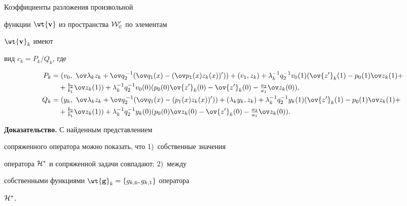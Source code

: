 \begin{thm} 


Коэффициенты разложения произвольной  


функции $\wt{\bold v}$ из пространства $\cal W^0_2$ по элементам 


$\wt{\bold v}_k$ имеют 


вид $c_k=P_k/Q_k$, где  


\begin{align*} 


P_k&=(v_0,\ \ov\lambda_k z_k+\ov q_2^{\,-1}(\ov q_1(x)- 


(\ov p_1(x)z_k(x))'))+


(v_1,z_k)+\lambda^{-1}_k q^{-1}_2 v_0(1)(\ov{z'}_k(1)- 


p_0(1)\ov z_k(1)+ \\ 


% 


&\quad +\tfrac{b_2}{b_1}\ov z_k(1))+\lambda^{-1}_k 


q^{-1}_2 v_0(0)(p_0(0)\ov{z'}_k(0)-\ov{z'}_k(0)- 


\tfrac{a_2}{a_1}\ov z_k(0)), \\ 


% 


Q_k&=(y_k,\ \ov\lambda_k z_k+\ov q_2^{\,-1}(\ov q_1(x)- 


(p_1(x)z_k(x))'))+(\lambda_k y_k,z_k) 


+\lambda^{-1}_k q^{-1}_2 y_k(1)(\ov{z'}_k(1)- 


p_0(1)\ov z_k(1)+ \\ 


% 


&\quad +\tfrac{b_2}{b_1}\ov z_k(1))+\lambda^{-1}_k 


q^{-1}_2 y_k(0)(p_0(0)\ov z_k(0)-\ov{z'}_k(0)- 


\tfrac{a_2}{a_1}\ov z_k(0)).\end{align*} 


\end{thm} 


 


{\bf Доказательство.} С найденным представлением 


сопряженного оператора можно показать, что 1)~собственные значения  


оператора $\cal H^*$ и сопряженной задачи совпадают; 2)~между  


собственными функциями $\wt{\bold g}_k=\{g_{k,0},g_{k,1}\}$ оператора 


$\cal H^*$,  


